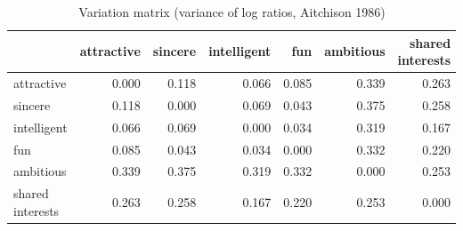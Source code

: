 \begin{table}[htbp]
\centering
\caption{Variation matrix (variance of log ratios, Aitchison 1986)}
\label{tab:q3_variation_matrix}
\begin{tabular}{lrrrrrr}
\toprule
 & attractive & sincere & intelligent & fun & ambitious & shared interests \\
\midrule
attractive & 0.000 & 0.118 & 0.066 & 0.085 & 0.339 & 0.263 \\
sincere & 0.118 & 0.000 & 0.069 & 0.043 & 0.375 & 0.258 \\
intelligent & 0.066 & 0.069 & 0.000 & 0.034 & 0.319 & 0.167 \\
fun & 0.085 & 0.043 & 0.034 & 0.000 & 0.332 & 0.220 \\
ambitious & 0.339 & 0.375 & 0.319 & 0.332 & 0.000 & 0.253 \\
shared interests & 0.263 & 0.258 & 0.167 & 0.220 & 0.253 & 0.000 \\
\bottomrule
\end{tabular}
\end{table}
